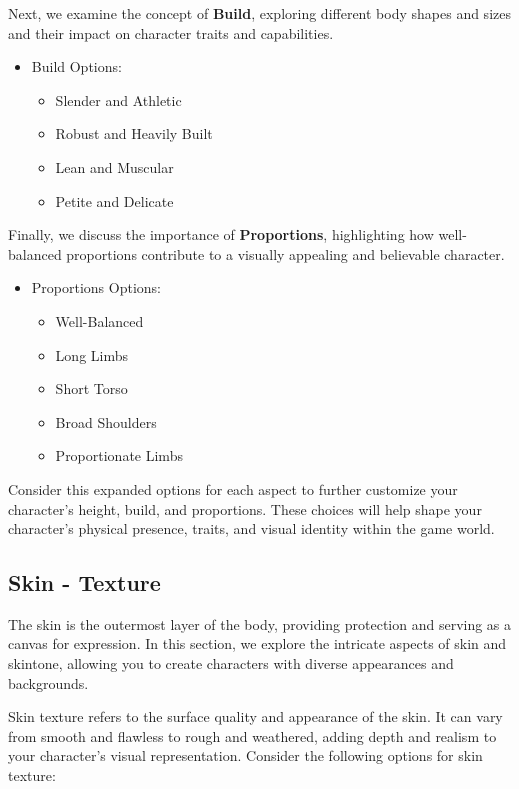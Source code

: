 \documentclass[12pt]{book}  %
\begin{document}
Next, we examine the concept of \textbf{Build}, exploring different body shapes and sizes and their impact on character traits and capabilities.

\begin{itemize}
    \item Build Options:
    \begin{itemize}
        \item Slender and Athletic
        \item Robust and Heavily Built
        \item Lean and Muscular
        \item Petite and Delicate
    \end{itemize}
\end{itemize}

Finally, we discuss the importance of \textbf{Proportions}, highlighting how well-balanced proportions contribute to a visually appealing and believable character.

\begin{itemize}
    \item Proportions Options:
    \begin{itemize}
        \item Well-Balanced
        \item Long Limbs
        \item Short Torso
        \item Broad Shoulders
        \item Proportionate Limbs
    \end{itemize}
\end{itemize}

Consider this expanded options for each aspect to further customize your character's height, build, and proportions. These choices will help shape your character's physical presence, traits, and visual identity within the game world.

\subsection{\textbf{Skin  - Texture}}

The skin is the outermost layer of the body, providing protection and serving as a canvas for expression. In this section, we explore the intricate aspects of skin and skintone, allowing you to create characters with diverse appearances and backgrounds.

Skin texture refers to the surface quality and appearance of the skin. It can vary from smooth and flawless to rough and weathered, adding depth and realism to your character's visual representation. Consider the following options for skin texture:
\end{document}
